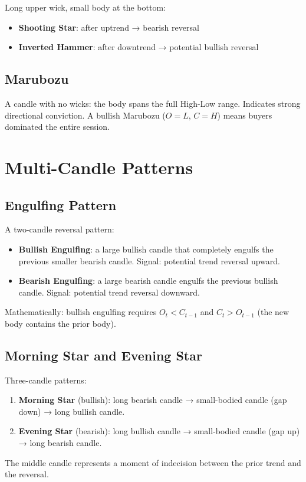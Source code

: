 \documentclass[12pt,a4paper,openany]{report}
\theoremstyle{definition}
\begin{document}
Long upper wick, small body at the bottom:
\begin{itemize}
  \item \textbf{Shooting Star}: after uptrend → bearish reversal
  \item \textbf{Inverted Hammer}: after downtrend → potential bullish reversal
\end{itemize}

\subsection{Marubozu}

A candle with no wicks: the body spans the full High-Low range. Indicates strong directional conviction. A bullish Marubozu ($O = L$, $C = H$) means buyers dominated the entire session.

\section{Multi-Candle Patterns}

\subsection{Engulfing Pattern}

A two-candle reversal pattern:
\begin{itemize}
  \item \textbf{Bullish Engulfing}: a large bullish candle that completely engulfs the previous smaller bearish candle. Signal: potential trend reversal upward.
  \item \textbf{Bearish Engulfing}: a large bearish candle engulfs the previous bullish candle. Signal: potential trend reversal downward.
\end{itemize}

Mathematically: bullish engulfing requires $O_t < C_{t-1}$ and $C_t > O_{t-1}$ (the new body contains the prior body).

\subsection{Morning Star and Evening Star}

Three-candle patterns:
\begin{enumerate}[label=\arabic*.]
  \item \textbf{Morning Star} (bullish): long bearish candle → small-bodied candle (gap down) → long bullish candle.
  \item \textbf{Evening Star} (bearish): long bullish candle → small-bodied candle (gap up) → long bearish candle.
\end{enumerate}
The middle candle represents a moment of indecision between the prior trend and the reversal.
\end{document}

